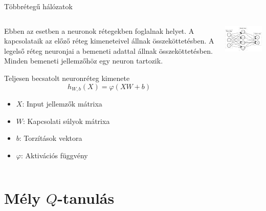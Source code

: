 \documentclass[english, aspectratio=169]{beamer}
\makeatletter
\let\origtableofcontents=\tableofcontents
\def\tableofcontents{\@ifnextchar[{\origtableofcontents}{\gobbletableofcontents}}
\def\gobbletableofcontents#1{\origtableofcontents}
\makeatother
\begin{document}
\begin{frame}{Többrétegű hálózatok}
\begin{columns}
\begin{column}{.5\textwidth}
Ebben az esetben a neuronok rétegekben foglalnak helyet. A kapcsolataik az előző réteg kimeneteivel állnak összeköttetésben. A legelső réteg neuronjai a bemeneti adattal állnak összeköttetésben. Minden bemeneti jellemzőhöz egy neuron tartozik.\par\smallskip
\begin{block}{Teljesen becsatolt neuronréteg kimenete}
\[
h_{W,b}(X)=\varphi(XW+b)
\]
\vspace{-0.5cm}
\begin{itemize}
	\item $X$: Input jellemzők mátrixa
	\item $W$: Kapcsolati súlyok mátrixa
	\item $b$: Torzítások vektora
	\item $\varphi$: Aktivációs függvény
\end{itemize}
\end{block}
\end{column}
\begin{column}{.5\textwidth}
\begin{center}
\includegraphics[width=7cm, keepaspectratio]{../../7_dl/doc/graphs/dl_0.png}
\end{center}
\end{column}
\end{columns}
\end{frame}

\section{Mély $Q$-tanulás}

\begin{frame}
\tableofcontents[currentsection]
\end{frame}
\end{document}
